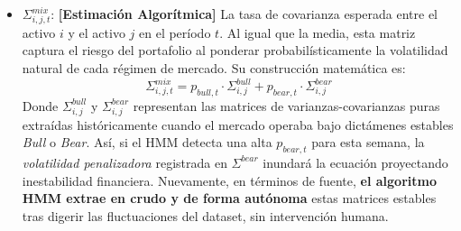 \documentclass[11pt,a4paper]{article}
\begin{document}
\begin{itemize}
    \vspace{2mm}
    \textit{\textbf{(Zoom sobre la Unidad de Medida: ¿Cómo se leen estos retornos $\boldsymbol{\mu}$?)}}\\
    \textit{Es imperativo recalcar que $\mu$ \textbf{está en base porcentual, NO es dinero físico} (no son dólares ni euros) y \textbf{SÍ puede ser negativo} (indicando destrucción de valor). La unidad exacta de $\mu$ extraída de \texttt{ps.gms} es el \textbf{Retorno Logarítmico Semanal} (un decimal). Si la data histórica de Binance dice que la Cripto en un rally Bull saltó de \$100 a \$105 en 7 días, su $\mu^{bull}$ histórico es de $\approx 0.05$ (+5\% semanal). Si en un crash Bear cayó estrepitosamente, su $\mu^{bear}$ será negativo (ej. $-0.15$). Como todos los factores dentro de la sumatoria (los pesos $w$, la fricción $c_i$, la varianza $\Sigma$) son porcentajes unitarios, esto significa que la Función Objetivo Final $\mathbf{Z}$ \textbf{no maximiza billetes, sino que maximiza la tasa bruta de rendimiento porcentual} de toda la cartera. Es indiferente si operas con \$10 USD o con \$10 Millones, a Z solo le importa hallar el mejor porcentaje de ganancia neta en el tiempo.}
    \item $\Sigma^{mix}_{i,j,t}$: \textbf{[Estimación Algorítmica]} La tasa de covarianza esperada entre el activo $i$ y el activo $j$ en el período $t$. Al igual que la media, esta matriz captura el riesgo del portafolio al ponderar probabilísticamente la volatilidad natural de cada régimen de mercado. Su construcción matemática es:
    \[ \Sigma^{mix}_{i,j,t} = p_{bull, t} \cdot \Sigma^{bull}_{i,j} + p_{bear, t} \cdot \Sigma^{bear}_{i,j} \]
    Donde $\Sigma^{bull}_{i,j}$ y $\Sigma^{bear}_{i,j}$ representan las matrices de varianzas-covarianzas puras extraídas históricamente cuando el mercado operaba bajo dictámenes estables \textit{Bull} o \textit{Bear}. Así, si el HMM detecta una alta $p_{bear, t}$ para esta semana, la \textit{volatilidad penalizadora} registrada en $\Sigma^{bear}$ inundará la ecuación proyectando inestabilidad financiera. Nuevamente, en términos de fuente, \textbf{el algoritmo HMM extrae en crudo y de forma autónoma} estas matrices estables tras digerir las fluctuaciones del dataset, sin intervención humana.
    


\end{itemize}
\end{document}

